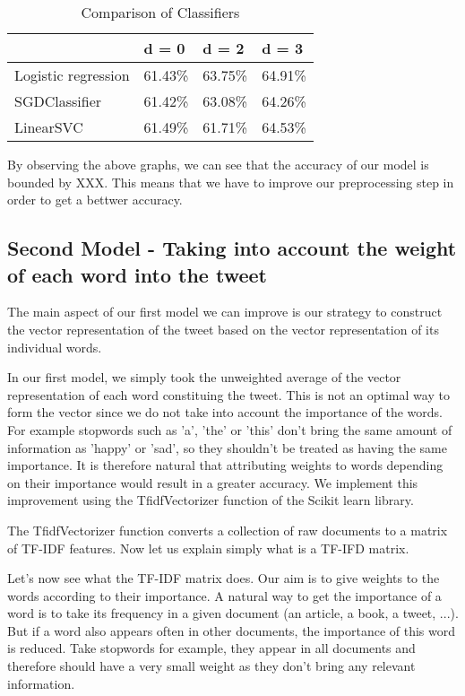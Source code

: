 \documentclass[10pt,conference,compsocconf]{IEEEtran}
\begin{document}
\begin{table}[H]
\centering
\caption{Comparison of Classifiers}
\begin{tabular}{@{}llll@{}}
    \toprule
    & d = 0 & d = 2 & d = 3 \\
    \hline
    Logistic regression & 61.43\% & 63.75\% & 64.91\% \\
    SGDClassifier & 61.42\% & 63.08\% & 64.26\% \\
    LinearSVC & 61.49\% & 61.71\% & 64.53\% \\
    \bottomrule
\end{tabular}
\end{table}

By observing the above graphs, we can see that the accuracy of our model is bounded by XXX.
This means that we have to improve our preprocessing step in order to get a bettwer accuracy.

\subsection{Second Model - Taking into account the weight of each word into the tweet}

The main aspect of our first model we can improve is our strategy to construct the vector representation of the tweet based on the vector representation of its individual words.

In our first model, we simply took the unweighted average of the vector representation of each word constituing the tweet. This is not an optimal way to form the vector since we do not take into account the importance of the words. For example stopwords such as 'a', 'the' or 'this' don't bring the same amount of information as 'happy' or 'sad', so they shouldn't be treated as having the same importance. It is therefore natural that attributing weights to words depending on their importance would result in a greater accuracy. We implement this improvement using the TfidfVectorizer function of the Scikit learn library.

The TfidfVectorizer function converts a collection of raw documents to a matrix of TF-IDF features. Now let us explain simply what is a TF-IFD matrix.

Let's now see what the TF-IDF matrix does.
Our aim is to give weights to the words according to their importance. A natural way to get the importance of a word is to take its frequency in a given document (an article, a book, a tweet, ...). But if a word also appears often in other documents, the importance of this word is reduced. Take stopwords for example, they appear in all documents and therefore should have a very small weight as they don't bring any relevant information.
\end{document}
